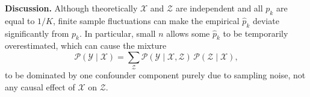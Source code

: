 \documentclass[10pt,twocolumn,letterpaper]{article}
\theoremstyle{plain}
\theoremstyle{definition}
\theoremstyle{remark}
\begin{document}
\noindent
\textbf{Discussion.}  
Although theoretically $\mathcal{X}$ and $\mathcal{Z}$ are independent and all $p_k$ are equal to $1/K$, 
finite sample fluctuations can make the empirical $\hat{p}_k$ deviate significantly from $p_k$. 
In particular, small $n$ allows some $\hat p_k$ to be temporarily overestimated, 
which can cause the mixture
\begin{equation}
    \mathcal{P}(\mathcal{Y} \mid \mathcal{X}) 
    = \sum_{\mathcal{Z}} \mathcal{P}(\mathcal{Y} \mid \mathcal{X}, \mathcal{Z}) \, \mathcal{P}(\mathcal{Z} \mid \mathcal{X}) ,
    \label{equ:bayes_rule}
\end{equation}
to be dominated by one confounder component purely due to sampling noise, not any causal effect of $\mathcal{X}$ on $\mathcal{Z}$.








{
    \small
    
    
}
\end{document}
